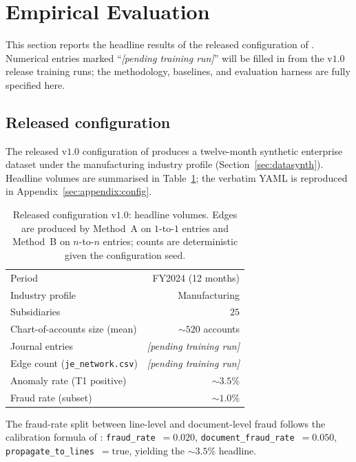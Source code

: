 \section{Empirical Evaluation}
\label{sec:evaluation}

This section reports the headline results of the released
configuration of \bench{}.  Numerical entries marked
``\textit{[pending training run]}'' will be filled in from the
v$1.0$ release training runs; the methodology, baselines, and
evaluation harness are fully specified here.

\subsection{Released configuration}
\label{sec:evaluation:config}

The released v$1.0$ configuration of \bench{} produces a
twelve-month synthetic enterprise dataset under the
manufacturing industry profile (Section~\ref{sec:datasynth}).
Headline volumes are summarised in Table~\ref{tab:eval:volume};
the verbatim YAML is reproduced in
Appendix~\ref{sec:appendix:config}.

\begin{table}[H]
  \centering
  \caption{Released configuration v$1.0$: headline volumes.
    Edges are produced by Method~A on $1$-to-$1$ entries and
    Method~B on $n$-to-$n$ entries; counts are deterministic
    given the configuration seed.}
  \label{tab:eval:volume}
  \begin{tabular}{lr}
    \toprule
    Period             & FY2024 (12 months)\\
    Industry profile   & Manufacturing\\
    Subsidiaries       & $25$\\
    Chart-of-accounts size (mean) & $\sim$$520$ accounts\\
    Journal entries    & \textit{[pending training run]}\\
    Edge count (\texttt{je\_network.csv}) & \textit{[pending training run]}\\
    Anomaly rate (T1 positive)            & $\sim$$3.5\%$\\
    Fraud rate (subset)                   & $\sim$$1.0\%$\\
    \bottomrule
  \end{tabular}
\end{table}

The fraud-rate split between line-level and document-level fraud
follows the calibration formula of \citep{ivertowski2026datasynth}:
\texttt{fraud\_rate}~$= 0.020$, \texttt{document\_fraud\_rate}~$= 0.050$,
\texttt{propagate\_to\_lines}~$= \mathrm{true}$, yielding the
$\sim$$3.5\%$ headline.

